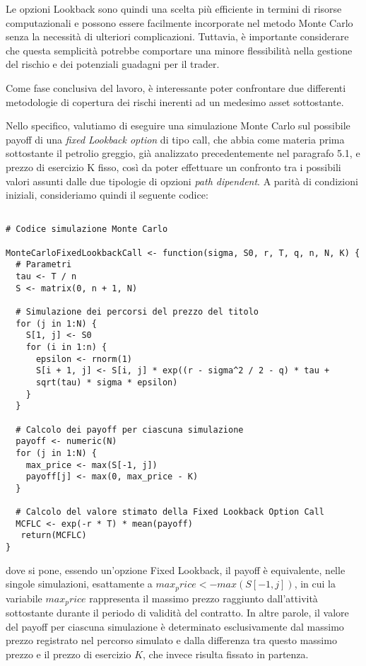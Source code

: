 \documentclass[12pt,a4paper]{report}
\begin{document}
Le opzioni Lookback sono quindi una scelta più efficiente in termini di risorse computazionali e possono essere facilmente incorporate nel metodo Monte Carlo senza la necessità di ulteriori complicazioni. Tuttavia, è importante considerare che questa semplicità potrebbe comportare una minore flessibilità nella gestione del rischio e dei potenziali guadagni per il trader.   

Come fase conclusiva del lavoro, è interessante poter confrontare due differenti metodologie di copertura dei rischi inerenti ad un medesimo asset sottostante.

Nello specifico, valutiamo di eseguire una simulazione Monte Carlo sul possibile payoff di una \textit{fixed Lookback option} di tipo call, che abbia come materia prima sottostante il petrolio greggio, già analizzato precedentemente nel paragrafo 5.1, e prezzo di esercizio K fisso, così da poter effettuare un confronto tra i possibili valori assunti dalle due tipologie di opzioni \textit{path dipendent}. A parità di condizioni iniziali, consideriamo quindi il seguente codice: 

\begin{verbatim}

# Codice simulazione Monte Carlo

MonteCarloFixedLookbackCall <- function(sigma, S0, r, T, q, n, N, K) {
  # Parametri
  tau <- T / n
  S <- matrix(0, n + 1, N)
  
  # Simulazione dei percorsi del prezzo del titolo
  for (j in 1:N) {
    S[1, j] <- S0
    for (i in 1:n) {
      epsilon <- rnorm(1)
      S[i + 1, j] <- S[i, j] * exp((r - sigma^2 / 2 - q) * tau + 
      sqrt(tau) * sigma * epsilon)
    }
  }
  
  # Calcolo dei payoff per ciascuna simulazione
  payoff <- numeric(N)
  for (j in 1:N) {
    max_price <- max(S[-1, j])
    payoff[j] <- max(0, max_price - K)
  }
  
  # Calcolo del valore stimato della Fixed Lookback Option Call
  MCFLC <- exp(-r * T) * mean(payoff)
   return(MCFLC)
}
\end{verbatim}

dove si pone, essendo un'opzione Fixed Lookback, il payoff è equivalente, nelle singole simulazioni, esattamente a $max_price <- max(S[-1, j])$, in cui la variabile $max_price$ rappresenta il massimo prezzo raggiunto dall'attività sottostante durante il periodo di validità del contratto. In altre parole, il valore del payoff per ciascuna simulazione è determinato esclusivamente dal massimo prezzo registrato nel percorso simulato e dalla differenza tra questo massimo prezzo e il prezzo di esercizio $K$, che invece risulta fissato in partenza.
\end{document}
